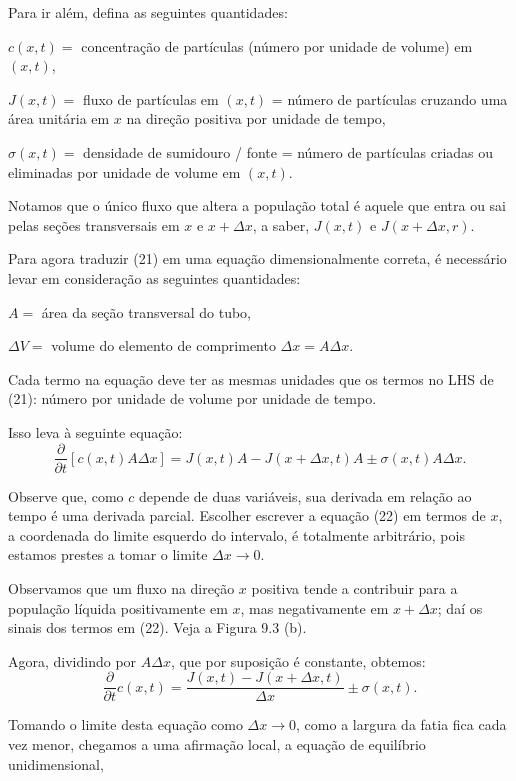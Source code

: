 Para ir além, defina as seguintes quantidades:

$c(x, t) =$ concentração de partículas (número por unidade de volume) em $(x, t)$,

$J(x, t) =$ fluxo de partículas em $(x, t)$ = número de partículas cruzando uma área unitária em $x$ na direção positiva por unidade de tempo,

$\sigma (x, t) =$ densidade de sumidouro / fonte = número de partículas criadas ou eliminadas por unidade de volume em $(x, t)$.


Notamos que o único fluxo que altera a população total é aquele que entra ou sai pelas seções transversais em $x$ e $x + \Delta x$, a saber, $J(x, t)$ e $J(x + \Delta x, r)$.

Para agora traduzir (21) em uma equação dimensionalmente correta, é necessário levar em consideração as seguintes quantidades:

$A =$ área da seção transversal do tubo,

$\Delta V =$ volume do elemento de comprimento $\Delta x = A \Delta x$.

Cada termo na equação deve ter as mesmas unidades que os termos no LHS de (21): número por unidade de volume por unidade de tempo.

Isso leva à seguinte equação:
$$\dfrac{\partial}{\partial t} [c(x, t) A \Delta x]
= J(x, t) A - J(x + \Delta x, t) A \pm \sigma(x, t) A \Delta x.
$$

Observe que, como $c$ depende de duas variáveis, sua derivada em relação ao tempo é uma derivada parcial. Escolher escrever a equação (22) em termos de $x$, a coordenada do limite esquerdo do intervalo, é totalmente arbitrário, pois estamos prestes a tomar o limite $\Delta x \to 0$.

Observamos que um fluxo na direção $x$ positiva tende a contribuir para a população líquida positivamente em $x$, mas negativamente em $x + \Delta x$; daí os sinais dos termos em (22). Veja a Figura 9.3 (b).

Agora, dividindo por $A \Delta x$, que por suposição é constante, obtemos:
$$
\dfrac{\partial}{\partial t} c(x, t) = \dfrac{J(x, t) - J(x + \Delta x, t)}{\Delta x} \pm \sigma(x, t).
$$





Tomando o limite desta equação como $\Delta x \to 0$, como a largura da fatia fica cada vez menor, chegamos a uma afirmação local, a equação de equilíbrio unidimensional,

